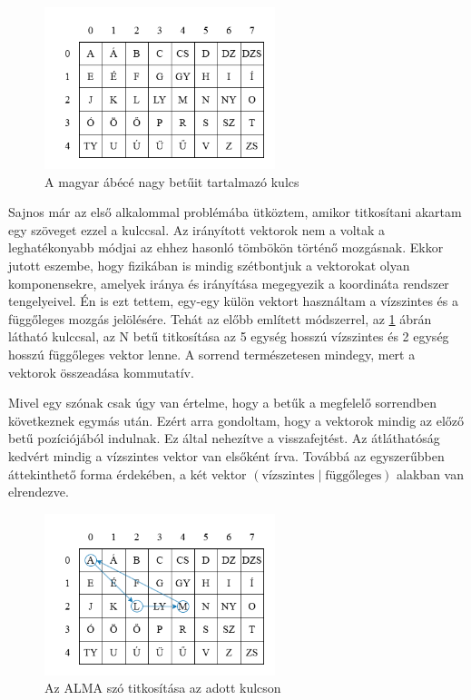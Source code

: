 \documentclass[12pt]{report} %
\begin{document}
\begin{figure}[H]
    \centering %
    \includegraphics[width=0.6\textwidth]{Figures/MyAlgorithm1.png} %
    \caption{A magyar ábécé nagy betűit tartalmazó kulcs} %
    \label{fig:MyAlgorithm1} %
\end{figure}

Sajnos már az első alkalommal problémába ütköztem, amikor titkosítani akartam egy szöveget ezzel a kulccsal. Az irányított vektorok nem a voltak a leghatékonyabb módjai az ehhez hasonló tömbökön történő mozgásnak. Ekkor jutott eszembe, hogy fizikában is mindig szétbontjuk a vektorokat olyan komponensekre, amelyek iránya és irányítása megegyezik a koordináta rendszer tengelyeivel. Én is ezt tettem, egy-egy külön vektort használtam a vízszintes és a  függőleges mozgás jelölésére. Tehát az előbb említett módszerrel, az \ref{fig:MyAlgorithm1} ábrán látható kulccsal, az N betű titkosítása az 5 egység hosszú vízszintes és 2 egység hosszú függőleges vektor lenne. A sorrend természetesen mindegy, mert a vektorok összeadása kommutatív.

Mivel egy szónak csak úgy van értelme, hogy a betűk a megfelelő sorrendben következnek egymás után. Ezért arra gondoltam, hogy a vektorok mindig az előző betű pozíciójából indulnak. Ez által nehezítve a visszafejtést. Az átláthatóság kedvért mindig a vízszintes vektor van elsőként írva. Továbbá az egyszerűbben áttekinthető forma érdekében, a két vektor $(\text{vízszintes} \mid \text{függőleges})$ alakban van elrendezve.

\begin{figure}[H]
    \centering %
    \includegraphics[width=0.6\textwidth]{Figures/MyAlgorithm2.png} %
    \caption{Az ALMA szó titkosítása az adott kulcson} %
    \label{fig:MyAlgorithm2} %
\end{figure}
\end{document}
